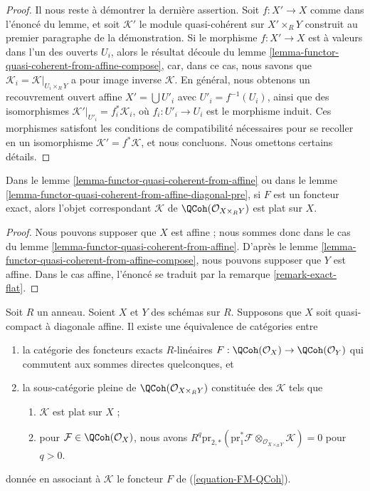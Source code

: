 \begin{proof}
\medskip\noindent
Il nous reste à démontrer la dernière assertion. Soit $f : X' \to X$
comme dans l'énoncé du lemme, et soit $\mathcal{K}'$
le module quasi-cohérent sur $X' \times_R Y$ construit
au premier paragraphe de la démonstration. Si le morphisme
$f : X' \to X$ est à valeurs dans l'un des ouverts $U_i$, alors le
résultat découle du
lemme \ref{lemma-functor-quasi-coherent-from-affine-compose},
car, dans ce cas, nous savons
que $\mathcal{K}_i = \mathcal{K}|_{U_i \times_R Y}$
a pour image inverse $\mathcal{K}$. En général, nous obtenons un
recouvrement ouvert affine $X' = \bigcup U'_i$ avec $U'_i = f^{-1}(U_i)$,
ainsi que des isomorphismes
$\mathcal{K}'|_{U'_i} = f_i^*\mathcal{K}_i$, où
$f_i : U'_i \to U_i$ est le morphisme induit.
Ces morphismes satisfont les conditions de compatibilité nécessaires
pour se recoller en un isomorphisme $\mathcal{K}' = f^*\mathcal{K}$,
et nous concluons. Nous omettons certains détails.
\end{proof}

\begin{lemma}
\label{lemma-coh-noetherian-from-affine-flat}
Dans le lemme \ref{lemma-functor-quasi-coherent-from-affine}
ou dans le lemme \ref{lemma-functor-quasi-coherent-from-affine-diagonal-pre},
si $F$ est un foncteur exact, alors l'objet correspondant
$\mathcal{K}$ de $\QCoh(\mathcal{O}_{X \times_R Y})$ est plat sur $X$.
\end{lemma}

\begin{proof}
Nous pouvons supposer que $X$ est affine ; nous sommes donc dans le cas du
lemme \ref{lemma-functor-quasi-coherent-from-affine}.
D'après le lemme \ref{lemma-functor-quasi-coherent-from-affine-compose},
nous pouvons supposer que $Y$ est affine. Dans le cas affine, l'énoncé
se traduit par la remarque \ref{remark-exact-flat}.
\end{proof}

\begin{lemma}
\label{lemma-functor-quasi-coherent-from-affine-diagonal}
Soit $R$ un anneau. Soient $X$ et $Y$ des schémas sur $R$. Supposons que $X$ soit
quasi-compact à diagonale affine.
Il existe une équivalence de catégories entre
\begin{enumerate}
\item la catégorie des foncteurs exacts $R$-linéaires
$F : \QCoh(\mathcal{O}_X) \to \QCoh(\mathcal{O}_Y)$
qui commutent aux sommes directes quelconques, et
\item la sous-catégorie pleine de $\QCoh(\mathcal{O}_{X \times_R Y})$ constituée
des $\mathcal{K}$ tels que
\begin{enumerate}
\item $\mathcal{K}$ est plat sur $X$ ;
\item pour $\mathcal{F} \in \QCoh(\mathcal{O}_X)$, nous avons
$R^q\text{pr}_{2, *}(\text{pr}_1^*\mathcal{F}
\otimes_{\mathcal{O}_{X \times_R Y}} \mathcal{K}) = 0$ pour $q > 0$.
\end{enumerate}
\end{enumerate}
donnée en associant à $\mathcal{K}$ le foncteur $F$ de (\ref{equation-FM-QCoh}).
\end{lemma}

